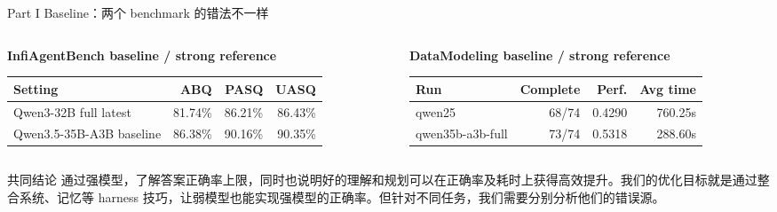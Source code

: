 \documentclass[aspectratio=169,UTF8]{ctexbeamer}
\begin{document}
\begin{frame}{Part I Baseline：两个 benchmark 的错法不一样}
\footnotesize
\begin{columns}[T]
\begin{column}{0.49\textwidth}
\textbf{InfiAgentBench baseline / strong reference}
\vspace{0.3em}

\begin{tabularx}{\textwidth}{X r r r}
\toprule
Setting & ABQ & PASQ & UASQ \\
\midrule
Qwen3-32B full latest & 81.74\% & 86.21\% & 86.43\% \\
Qwen3.5-35B-A3B baseline & 86.38\% & 90.16\% & 90.35\% \\
\bottomrule
\end{tabularx}
\end{column}
\begin{column}{0.49\textwidth}
\textbf{DataModeling baseline / strong reference}
\vspace{0.3em}

\begin{tabularx}{\textwidth}{X r r r}
\toprule
Run & Complete & Perf. & Avg time \\
\midrule
qwen25 & 68/74 & 0.4290 & 760.25s \\
qwen35b-a3b-full & 73/74 & 0.5318 & 288.60s \\
\bottomrule
\end{tabularx}
\end{column}
\end{columns}
\vspace{0.7em}
\begin{alertblock}{共同结论}
通过强模型，了解答案正确率上限，同时也说明好的理解和规划可以在正确率及耗时上获得高效提升。我们的优化目标就是通过整合系统、记忆等 harness 技巧，让弱模型也能实现强模型的正确率。但针对不同任务，我们需要分别分析他们的错误源。
\end{alertblock}
\end{frame}
\end{document}
